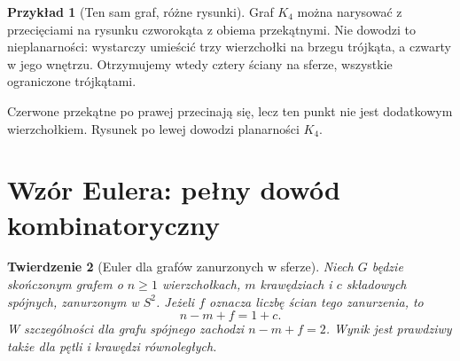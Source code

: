\documentclass[11pt,a4paper]{report}
\numberwithin{equation}{section}
\theoremstyle{plain}
\newtheorem{twierdzenie}{Twierdzenie}[section]
\theoremstyle{definition}
\newtheorem{przyklad}[twierdzenie]{Przykład}
\theoremstyle{remark}
\begin{document}
\begin{przyklad}[Ten sam graf, różne rysunki]
Graf $K_4$ można narysować z przecięciami na rysunku czworokąta
z obiema przekątnymi. Nie dowodzi to nieplanarności: wystarczy
umieścić trzy wierzchołki na brzegu trójkąta, a czwarty w jego wnętrzu.
Otrzymujemy wtedy cztery ściany na sferze, wszystkie ograniczone
trójkątami.
\end{przyklad}

\begin{center}

{\footnotesize Czerwone przekątne po prawej przecinają się, lecz ten punkt
nie jest dodatkowym wierzchołkiem. Rysunek po lewej dowodzi planarności $K_4$.}
\end{center}

\section{Wzór Eulera: pełny dowód kombinatoryczny}
\label{sec:tg-planarny-euler}

\begin{twierdzenie}[Euler dla grafów zanurzonych w sferze]
\label{thm:tg-euler-plane}
Niech $G$ będzie skończonym grafem o $n\ge1$ wierzchołkach,
$m$ krawędziach i $c$ składowych spójnych, zanurzonym w $S^2$.
Jeżeli $f$ oznacza liczbę ścian tego zanurzenia, to
\[
 n-m+f=1+c.
\]
W szczególności dla grafu spójnego zachodzi $n-m+f=2$.
Wynik jest prawdziwy także dla pętli i krawędzi równoległych.
\end{twierdzenie}
\end{document}
